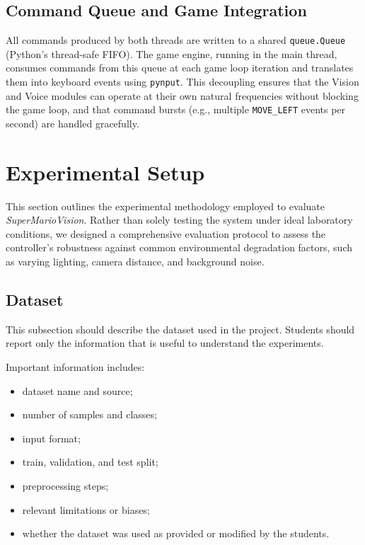 \documentclass[10pt,twocolumn,a4paper]{article}
\begin{document}
	\subsection{Command Queue and Game Integration}

	All commands produced by both threads are written to a shared \texttt{queue.Queue} (Python's thread-safe FIFO). The game engine, running in the main thread, consumes commands from this queue at each game loop iteration and translates them into keyboard events using \texttt{pynput}. This decoupling ensures that the Vision and Voice modules can operate at their own natural frequencies without blocking the game loop, and that command bursts (e.g., multiple \texttt{MOVE\_LEFT} events per second) are handled gracefully.
	
	\section{Experimental Setup}
    This section outlines the experimental methodology employed to evaluate \textit{SuperMarioVision}. Rather than solely testing the system under ideal laboratory conditions, we designed a comprehensive evaluation protocol to assess the controller's robustness against common environmental degradation factors, such as varying lighting, camera distance, and background noise.
	
	\subsection{Dataset}
	
	This subsection should describe the dataset used in the project. Students should report only the information that is useful to understand the experiments.
	
	Important information includes:
	\begin{itemize}
		\item dataset name and source;
		\item number of samples and classes;
		\item input format;
		\item train, validation, and test split;
		\item preprocessing steps;
		\item relevant limitations or biases;
		\item whether the dataset was used as provided or modified by the students.
	\end{itemize}
	
\end{document}
